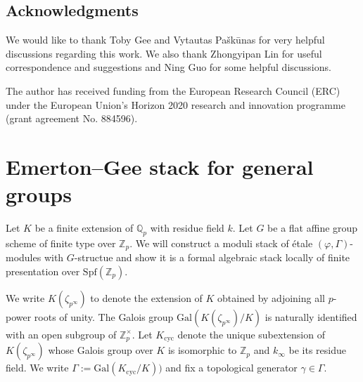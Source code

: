 \documentclass[10pt]{article}
\numberwithin{equation}{section}
\newcommand{\bQ}{{\mathbb Q}}
\newcommand{\bZ}{{\mathbb Z}}
\newcommand{\Gal}{{\mathrm{Gal}}}           %
\newcommand{\Spf}{{\mathrm{Spf}}}           %
\newcommand{\cyc}{{\mathrm{cyc}}}           %
\newcommand{\Nilp}{\mathrm{Nilp}}
\newcommand{\bfA}{{\textbf{A}}}
\newcommand{\bfAni}{\textbf{Ani}}
\newcommand{\bfNilp}{\textbf{Nilp}}
\begin{document}
    \subsection*{Acknowledgments}
We would like to thank Toby Gee and Vytautas Paškūnas for very helpful discussions regarding this work. We also thank Zhongyipan Lin for useful correspondence and suggestions and Ning Guo for some helpful discussions.

The author has received funding from the European Research Council (ERC) under the European Union's Horizon 2020 research and innovation programme (grant agreement No. 884596).














\section{Emerton--Gee stack for general groups}
Let $K$ be a finite extension of $\bQ_p$ with residue field $k$. Let $G$ be a flat affine group scheme of finite type over $\bZ_p$. We will construct a moduli stack of \'etale $(\varphi,\Gamma)$-modules with $G$-structue and show it is a formal algebraic stack locally of finite presentation over $\Spf(\bZ_p)$.




We write $K(\zeta_{p^{\infty}})$ to denote the extension of $K$ obtained by adjoining all $p$-power roots of unity. The Galois group $\Gal(K(\zeta_{p^{\infty}})/K)$ is naturally identified with an open subgroup of $\bZ_p^{\times}$. Let $K_{\cyc}$ denote the unique subextension of $K(\zeta_{p^{\infty}})$ whose Galois group over $K$ is isomorphic to $\bZ_p$ and $k_{\infty}$ be its residue field. We write $\Gamma:=\Gal(K_{\cyc}/K))$ and fix a topological generator $\gamma\in \Gamma$.
\end{document}
